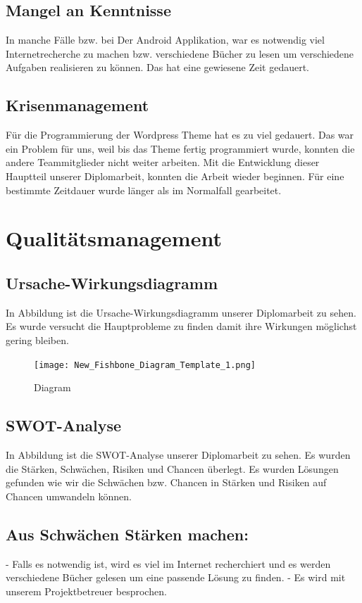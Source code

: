 \subsection{Mangel an Kenntnisse}
In manche Fälle bzw. bei Der Android Applikation, war es notwendig viel Internetrecherche zu machen bzw. verschiedene Bücher zu lesen um verschiedene Aufgaben realisieren zu können. Das hat eine gewiesene Zeit gedauert.
\subsection{Krisenmanagement}
Für die Programmierung der Wordpress Theme hat es zu viel gedauert. Das war ein Problem für uns, weil bis das Theme fertig programmiert wurde, konnten die andere Teammitglieder nicht weiter arbeiten. Mit die Entwicklung dieser Hauptteil unserer Diplomarbeit, konnten die Arbeit wieder beginnen. Für eine bestimmte Zeitdauer wurde länger als im Normalfall gearbeitet.
\section{Qualitätsmanagement}
\subsection{Ursache-Wirkungsdiagramm}
In Abbildung ist die Ursache-Wirkungsdiagramm unserer Diplomarbeit zu sehen. Es wurde versucht die Hauptprobleme zu finden damit ihre Wirkungen möglichst gering bleiben.
\newpage
\begin{figure}[!h]
  \texttt{[image: New\_Fishbone\_Diagram\_Template\_1.png]}
  \caption{Diagram}
  \label{fig:Diagram}
\end{figure}

\subsection{SWOT-Analyse}
In Abbildung ist die SWOT-Analyse unserer Diplomarbeit zu sehen. Es wurden die Stärken, Schwächen, Risiken und Chancen überlegt. Es wurden Lösungen gefunden wie wir die Schwächen bzw. Chancen in Stärken und Risiken auf Chancen umwandeln können.

\subsection*{Aus Schwächen Stärken machen:}
- Falls es notwendig ist, wird es viel im Internet recherchiert und es werden verschiedene Bücher gelesen um eine passende Lösung zu finden. 
- Es wird mit unserem Projektbetreuer besprochen.

